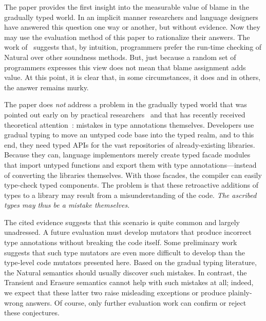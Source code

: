 
The paper provides the first insight into the measurable value of blame in the
gradually typed world. In an implicit manner researchers and language designers
have answered this question one way or another, but without evidence. Now they
may use the evaluation method of this paper to rationalize their answers.  The
work of~\citet{tgpk-dls-2018} suggests that, by intuition, programmers prefer
the run-time checking of Natural over other soundness methods. But, just because
a random set of programmers expresses this view does not mean that blame
assignment adds value. At this point, it is clear that, in some circumstances,
it does and in others, the answer remains murky.

The paper does {\em not\/} address a problem in the gradually typed world that
was pointed out early on by practical researchers~\cite{incorrect-ts,
sta-nt-base-types, wmwz-ecoop-2017} and that has recently received theoretical
attention~\cite{gfd-oopsla-2019, cc-oopsla-20}: mistakes in type annotations
themselves.  Developers use gradual typing to move an untyped code base into the
typed realm, and to this end, they need typed APIs for the vast repositories of
already-existing libraries. Because they can, language implementors merely
create typed facade modules that import untyped functions and export them with
type annotations---instead of converting the libraries themselves. With those
facades, the compiler can easily type-check typed components. The problem is
that these retroactive additions of types to a library may result from a
misunderstanding of the code. \emph{The ascribed types may thus be a mistake
themselves.}

The cited evidence suggests that this scenario is quite common and largely
unadressed.  A future evaluation must develop mutators that produce incorrect
type annotations without breaking the code itself. Some preliminary work
suggests that such type mutators are even more difficult to develop than the
type-level code mutators presented here. Based on the gradual typing literature,
the Natural semantics should usually discover such mistakes. In contrast, the
Transient and Erasure semantics cannot help with such mistakes at all; indeed,
we expect that these latter two raise misleading exceptions or produce
plainly-wrong answers.  Of course, only further evaluation work can confirm or
reject these conjectures.



